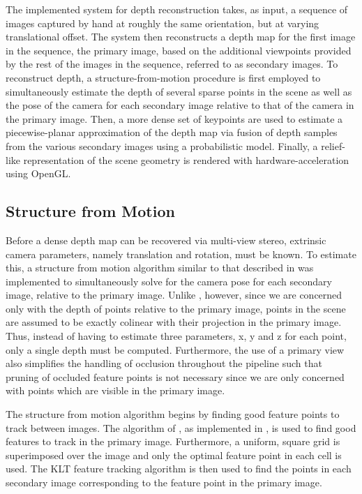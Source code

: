 \documentclass[conference]{acmsiggraph}
\begin{document}
The implemented system for depth reconstruction takes, as input, a sequence
of images captured by hand at roughly the same orientation, but at varying
translational offset.  The system then reconstructs a depth map for the
first image in the sequence, the primary image, based on the additional
viewpoints provided by the rest of the images in the sequence,
referred to as secondary images.
To reconstruct depth, a structure-from-motion
procedure is first employed to simultaneously estimate the depth of several
sparse points in the scene as well as the pose of the camera
for each secondary image relative to that of the camera in the primary image.
Then, a more dense set of keypoints are used to 
estimate a piecewise-planar approximation of the depth map
via fusion of depth samples from the various secondary images using
a probabilistic model.
Finally, a relief-like representation of the scene geometry is rendered
with hardware-acceleration using OpenGL.

\subsection{Structure from Motion}

Before a dense depth map can be recovered via multi-view stereo,
extrinsic camera parameters, namely translation and rotation, must be known.
To estimate this, a structure from motion algorithm similar to that
described in \cite{snavely2006photo} was implemented to
simultaneously solve for the camera pose for each secondary image,
relative to the primary image.
Unlike \cite{snavely2006photo}, however, since we are concerned
only with the depth of points relative to the primary image,
points in the scene are assumed to be exactly colinear with
their projection in the primary image.  Thus, instead of having
to estimate three parameters, x, y and z for each point,
only a single depth must be computed.  Furthermore, the use
of a primary view also simplifies the handling of occlusion throughout
the pipeline such that pruning of occluded feature points
is not necessary since we are only concerned with points which
are visible in the primary image.

The structure from motion algorithm begins by finding good feature points
to track between images.  The algorithm of \cite{shi1994good}, as implemented
in \cite{opencv_library}, is used to find good features to track in the
primary image.
Furthermore, a uniform, square grid is superimposed over the image and only
the optimal feature point in each cell is used.
The KLT feature tracking algorithm is then used to find the points in each
secondary image corresponding to the feature point in the primary image.
\end{document}
